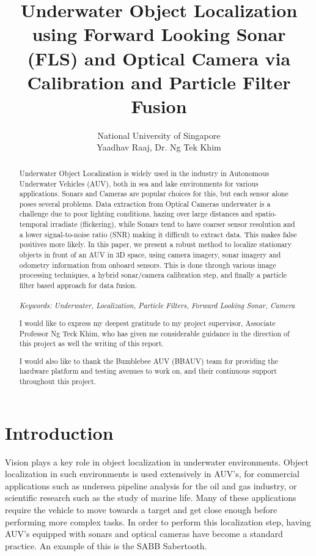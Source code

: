 \documentclass[15pt]{article}
\title{
Underwater Object Localization using Forward Looking Sonar (FLS) and Optical Camera via Calibration and Particle Filter Fusion
}
\author{
National University of Singapore \\
Yaadhav Raaj, Dr. Ng Tek Khim
}
\begin{document}
\maketitle
\newpage

\begin{abstract}
Underwater Object Localization is widely used in the industry in Autonomous Underwater Vehicles (AUV), both in sea and lake environments for various applications. Sonars and Cameras are popular choices for this, but each sensor alone poses several problems. Data extraction from Optical Cameras underwater is a challenge due to poor lighting conditions, hazing over large distances and spatio-temporal irradiate (flickering), while Sonars tend to have coarser sensor resolution and a lower signal-to-noise ratio (SNR) making it difficult to extract data. This makes false positives more likely. In this paper, we present a robust method to localize stationary objects in front of an AUV in 3D space, using camera imagery, sonar imagery and odometry information from onboard sensors. This is done through various image processing techniques, a hybrid sonar/camera calibration step, and finally a particle filter based approach for data fusion.
\\
\\
\textit{Keywords: Underwater, Localization, Particle Filters, Forward Looking Sonar, Camera}
\end{abstract}
\newpage

\renewcommand{\abstractname}{Acknowledgements}
\begin{abstract}
I would like to express my deepest gratitude to my project supervisor, Associate Professor Ng Teck Khim, who has given me considerable guidance in the direction of this project as well the writing of this report.

I would also like to thank the Bumblebee AUV (BBAUV) team for providing the hardware platform and testing avenues to work on, and their continuous support throughout this project.
\end{abstract}
\newpage

\tableofcontents
\newpage

\listoffigures
\newpage

\section{Introduction}
Vision plays a key role in object localization in underwater environments. Object localization in such environments is used extensively in AUV's, for commercial applications such as undersea pipeline analysis for the oil and gas industry, or scientific research such as the study of marine life. Many of these applications require the vehicle to move towards a target and get close enough before performing more complex tasks. In order to perform this localization step, having AUV's equipped with sonars and optical cameras have become a standard practice. An example of this is the SABB Sabertooth.
\end{document}
